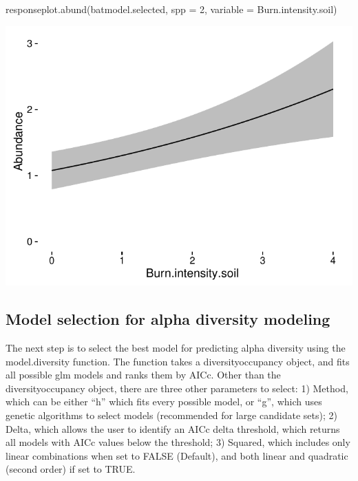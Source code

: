 \documentclass[article]{jss}
\begin{document}
\begin{CodeChunk}
\begin{CodeInput}
responseplot.abund(batmodel.selected, spp = 2, variable = Burn.intensity.soil)
\end{CodeInput}


\begin{center}\includegraphics{diversityocc_files/figure-latex/unnamed-chunk-16-1} \end{center}

\end{CodeChunk}

\subsection{Model selection for alpha diversity
modeling}\label{model-selection-for-alpha-diversity-modeling}

The next step is to select the best model for predicting alpha diversity
using the model.diversity function. The function takes a
diversityoccupancy object, and fits all possible glm models and ranks
them by AICc. Other than the diversityoccupancy object, there are three
other parameters to select: 1) Method, which can be either ``h'' which
fits every possible model, or ``g'', which uses genetic algorithms to
select models (recommended for large candidate sets); 2) Delta, which
allows the user to identify an AICc delta threshold, which returns all
models with AICc values below the threshold; 3) Squared, which includes
only linear combinations when set to FALSE (Default), and both linear
and quadratic (second order) if set to TRUE.
\end{document}
